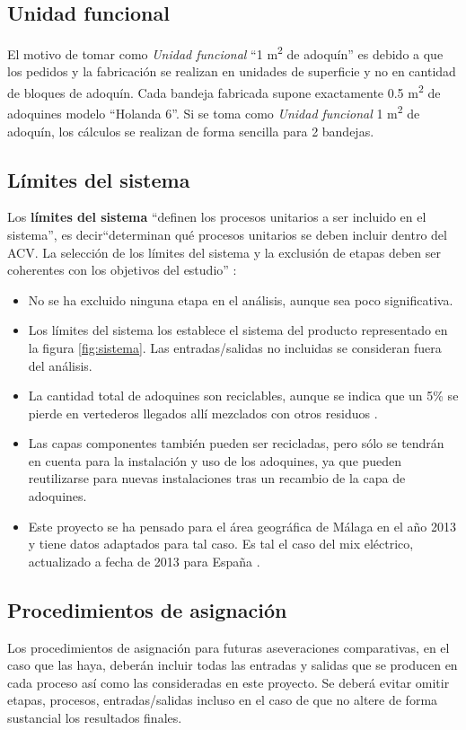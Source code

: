 \subsection{Unidad funcional}\label{sec:unidad_funcional}
El motivo de tomar como \textit{Unidad funcional} ``1 \si{m^2} de adoquín'' es debido a que los pedidos y la fabricación se realizan en unidades de superficie y no en cantidad de bloques de adoquín. Cada bandeja fabricada supone exactamente 0.5 \si{m^2} de adoquines modelo ``Holanda 6''. Si se toma como \textit{Unidad funcional} 1 \si{m^2} de adoquín, los cálculos se realizan de forma sencilla para 2 bandejas.

\subsection{Límites del sistema}
Los \textbf{límites del sistema} ``definen los procesos unitarios a ser incluido en el sistema'', es decir``determinan qué procesos unitarios se deben incluir dentro del ACV. La selección de los límites del sistema y la exclusión de etapas deben ser coherentes con los objetivos del estudio'' \cite{iso14040}:

\begin{itemize}
  \item No se ha excluido ninguna etapa en el análisis, aunque sea poco significativa.
  \item Los límites del sistema los establece el sistema del producto representado en la figura \ref{fig:sistema}. Las entradas/salidas no incluidas se consideran fuera del análisis.
  \item La cantidad total de adoquines son reciclables, aunque se indica que un 5\% se pierde en vertederos llegados allí mezclados con otros residuos \cite{euroadoquin}.
  \item Las capas componentes también pueden ser recicladas, pero sólo se tendrán en cuenta para la instalación y uso de los adoquines, ya que pueden reutilizarse para nuevas instalaciones tras un recambio de la capa de adoquines.
  \item Este proyecto se ha pensado para el área geográfica de Málaga en el año 2013 y tiene datos adaptados para tal caso. Es tal el caso del mix eléctrico, actualizado a fecha de 2013 para España \cite{mlgceballos}.
\end{itemize}

\subsection{Procedimientos de asignación}
Los procedimientos de asignación para futuras aseveraciones comparativas, en el caso que las haya, deberán incluir todas las entradas y salidas que se producen en cada proceso así como las consideradas en este proyecto. Se deberá evitar omitir etapas, procesos, entradas/salidas incluso en el caso de que no altere de forma sustancial los resultados finales.

